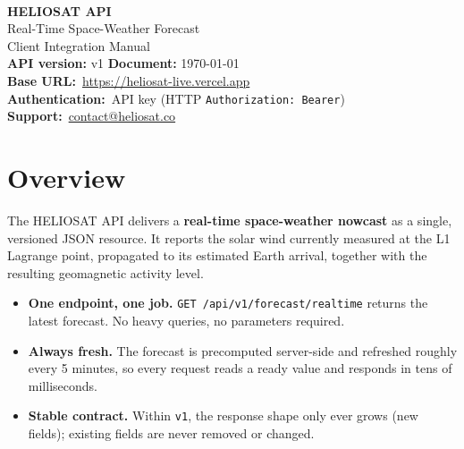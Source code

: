 \documentclass[11pt,a4paper]{article}
\newcommand{\tc}[1]{\texttt{#1}}
\newcommand{\baseurl}{https://heliosat-live.vercel.app}
\begin{document}
\begin{titlepage}
\thispagestyle{empty}
\vspace*{2cm}
\noindent{\color{heliosorange}\rule{\textwidth}{2pt}}\\[1.2cm]
{\fontsize{34}{40}\selectfont\bfseries\color{heliosnavy}HELIOSAT API}\\[0.4cm]
{\LARGE\color{heliosnavy}Real-Time Space-Weather Forecast}\\[0.3cm]
{\large Client Integration Manual}\\[1.0cm]
{\large\textbf{API version:} v1 \qquad \textbf{Document:} \today}\\[0.6cm]
\noindent{\color{heliosorange}\rule{\textwidth}{2pt}}
\vfill
\noindent\textbf{Base URL:}\ \url{\baseurl}\\
\textbf{Authentication:}\ API key (HTTP \tc{Authorization: Bearer})\\
\textbf{Support:}\ \href{mailto:contact@heliosat.co}{contact@heliosat.co}
\end{titlepage}

\tableofcontents
\newpage

\section{Overview}

The HELIOSAT API delivers a \textbf{real-time space-weather nowcast} as a single,
versioned JSON resource. It reports the solar wind currently measured at the L1
Lagrange point, propagated to its estimated Earth arrival, together with the
resulting geomagnetic activity level.

\begin{itemize}[leftmargin=1.4em]
  \item \textbf{One endpoint, one job.} \tc{GET /api/v1/forecast/realtime} returns the
        latest forecast. No heavy queries, no parameters required.
  \item \textbf{Always fresh.} The forecast is precomputed server-side and refreshed
        roughly every 5 minutes, so every request reads a ready value and responds in
        tens of milliseconds.
  \item \textbf{Stable contract.} Within \tc{v1}, the response shape only ever grows
        (new fields); existing fields are never removed or changed.
\end{itemize}
\end{document}
